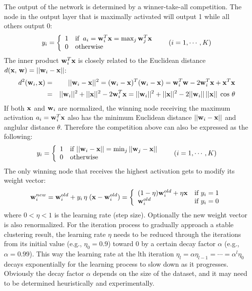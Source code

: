 \documentclass{article}
\begin{document}
The output of the network is determined by a winner-take-all competition. 
The node in the output layer that is maximally activated will output 1 
while all others output 0:
\begin{equation}
  y_i=\left\{ \begin{array}{ll} 1 & \mbox{if}\;\;
    a_i={\bf w}_i^T{\bf x}=\max_j {\bf w}_j^T{\bf x} \\ 0 & \mbox{otherwise}
  \end{array} \right.\;\;\;\;\;\;(i=1,\cdots,K)
\end{equation}
The inner product ${\bf w}_i^T{\bf x}$ is closely related to the 
Euclidean distance $d({\bf x},\,{\bf w})=||{\bf w}_i-{\bf x}||$:
\begin{eqnarray}
  d^2({\bf w}_i,{\bf x})&=&||{\bf w}_i-{\bf x}||^2
  =({\bf w}_i-{\bf x})^T({\bf w}_i-{\bf x})
  ={\bf w}_i^T{\bf w}-2{\bf w}_i^T{\bf x}+{\bf x}^T{\bf x}
  \nonumber\\
  &=&||{\bf w}_i||^2+||{\bf x}||^2-2{\bf w}_i^T{\bf x}
  =||{\bf w}_i||^2+||{\bf x}||^2-2||{\bf w}_i||\,||{\bf x}||\;\cos\,\theta 
\end{eqnarray}
If both ${\bf x}$ and ${\bf w}_i$ are normalized, the winning node 
receiving the maximum activation $a_i={\bf w}_i^T{\bf x}$ also has 
the minimum Euclidean distance $||{\bf w}_i-{\bf x}||$ and anglular
distance $\theta$. Therefore the competition above can also be 
expressed as the following:
\begin{equation}
  y_i=\left\{ \begin{array}{ll} 
    1 & \mbox{if } ||{\bf w}_i-{\bf x}||=\min_j||{\bf w}_j-{\bf x}||
    \\ 0 & \mbox{otherwise} \end{array}  \right.\;\;\;\;\;\;(i=1,\cdots,K)
\end{equation}
The only winning node that receives the highest activation gets to modify 
its weight vector:
\begin{equation} 
  {\bf w}_i^{new}={\bf w}_i^{old}+y_i\,\eta\;({\bf x}-{\bf w}_i^{old})
  =\left\{\begin{array}{ll}(1-\eta){\bf w}_i^{old}
  +\eta {\bf x}& \mbox{if }y_i=1\\{\bf w}_i^{old}& \mbox{if }y_i=0
  \end{array} \right. 
\end{equation}
where $0<\eta<1$ is the learning rate (step size). Optionally the new 
weight vector is also renormalized. For the iteration process to gradually 
approach a stable clustering result, the learning rate $\eta$ needs to be 
reduced through the iterations from its initial value (e.g., $\eta_0=0.9$) 
toward 0 by a certain decay factor $\alpha$ (e.g., $\alpha=0.99$). This 
way the learning rate at the lth iteration $\eta_l=\alpha \eta_{l-1}
=\cdots=\alpha^l\eta_0 $ decays exponentially for the learning process 
to slow down as it progresses. Obviously the decay factor $\alpha$ 
depends on the size of the dataset, and it may need to be determined 
heuristically and experimentally.
\end{document}
